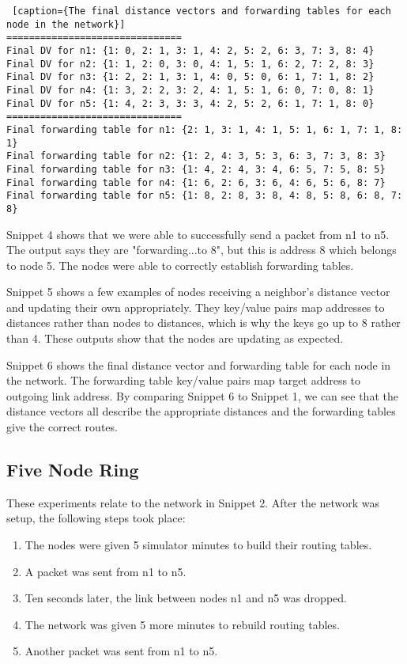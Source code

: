 \documentclass[11pt]{article}
\begin{document}
 \begin{lstlisting} [caption={The final distance vectors and forwarding tables for each node in the network}]
===============================
Final DV for n1: {1: 0, 2: 1, 3: 1, 4: 2, 5: 2, 6: 3, 7: 3, 8: 4}
Final DV for n2: {1: 1, 2: 0, 3: 0, 4: 1, 5: 1, 6: 2, 7: 2, 8: 3}
Final DV for n3: {1: 2, 2: 1, 3: 1, 4: 0, 5: 0, 6: 1, 7: 1, 8: 2}
Final DV for n4: {1: 3, 2: 2, 3: 2, 4: 1, 5: 1, 6: 0, 7: 0, 8: 1}
Final DV for n5: {1: 4, 2: 3, 3: 3, 4: 2, 5: 2, 6: 1, 7: 1, 8: 0}
===============================
Final forwarding table for n1: {2: 1, 3: 1, 4: 1, 5: 1, 6: 1, 7: 1, 8: 1}
Final forwarding table for n2: {1: 2, 4: 3, 5: 3, 6: 3, 7: 3, 8: 3}
Final forwarding table for n3: {1: 4, 2: 4, 3: 4, 6: 5, 7: 5, 8: 5}
Final forwarding table for n4: {1: 6, 2: 6, 3: 6, 4: 6, 5: 6, 8: 7}
Final forwarding table for n5: {1: 8, 2: 8, 3: 8, 4: 8, 5: 8, 6: 8, 7: 8}
\end{lstlisting}

Snippet 4 shows that we were able to successfully send a packet from n1 to n5. The output says they are "forwarding...to 8", but this is address 8 which belongs to node 5. The nodes were able to correctly establish forwarding tables.

Snippet 5 shows a few examples of nodes receiving a neighbor's distance vector and updating their own appropriately. They key/value pairs map addresses to distances rather than nodes to distances, which is why the keys go up to 8 rather than 4. These outputs show that the nodes are updating as expected.

Snippet 6 shows the final distance vector and forwarding table for each node in the network. The forwarding table key/value pairs map target address to outgoing link address. By comparing Snippet 6 to Snippet 1, we can see that the distance vectors all describe the appropriate distances and the forwarding tables give the correct routes.

\subsection{Five Node Ring}

These experiments relate to the network in Snippet 2. After the network was setup, the following steps took place:

\begin{enumerate}
  \item The nodes were given 5 simulator minutes to build their routing tables.
  \item A packet was sent from n1 to n5.
  \item Ten seconds later, the link between nodes n1 and n5 was dropped.
  \item The network was given 5 more minutes to rebuild routing tables.
  \item Another packet was sent from n1 to n5.
\end{enumerate}
\end{document}
